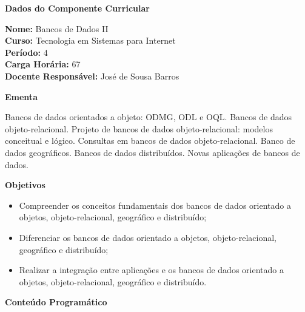 

\begin{snugshade}\begin{center}\textbf{
	Dados do Componente Curricular
}\end{center}\end{snugshade}

\noindent 	\textbf{Nome:} Bancos de Dados II
\\ 			\textbf{Curso:} Tecnologia em Sistemas para Internet
\\ 			\textbf{Período:} \unit{4}{\degree}
\\ 			\textbf{Carga Horária:} \unit{67}{\hour}
\\ 			\textbf{Docente Responsável:} José de Sousa Barros 


\begin{snugshade}\begin{center}\textbf{
    Ementa
\vphantom{q}}\end{center}\end{snugshade}

\noindent
Bancos de dados orientados a objeto: ODMG, ODL e OQL. Bancos de dados objeto-relacional. Projeto de bancos de dados objeto-relacional: modelos conceitual e lógico. Consultas em bancos de dados objeto-relacional. Banco de dados geográficos. Bancos de dados distribuídos. Novas aplicações de bancos de dados.


\begin{snugshade}\begin{center}\textbf{
    Objetivos
}\end{center}\end{snugshade}


\begin{itemize}

\item Compreender os conceitos fundamentais dos bancos de dados orientado a objetos, objeto-relacional, geográfico e distribuído;
\item Diferenciar os bancos de dados orientado a objetos, objeto-relacional, geográfico e distribuído;
\item Realizar a integração entre aplicações e os bancos de dados orientado a objetos, objeto-relacional, geográfico e distribuído.

\end{itemize}

\begin{snugshade}\begin{center}\textbf{
    Conteúdo Programático
}\end{center}\end{snugshade}

